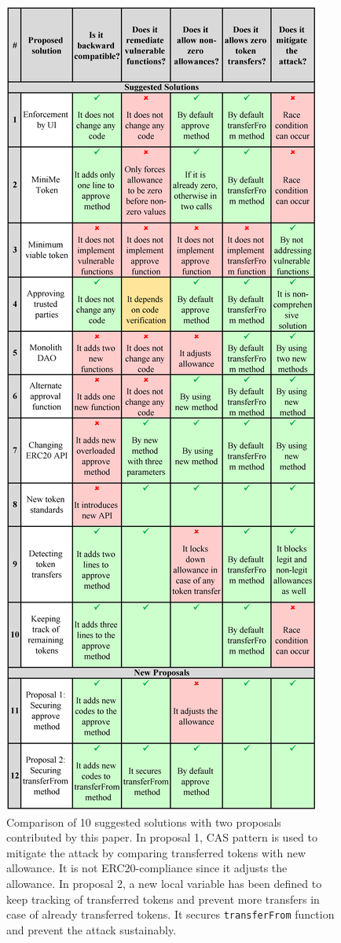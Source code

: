 \begin{figure}[t!]
	\centering
	\includegraphics[width=1.0\linewidth]{figures/multiple_withdrawal_34.png}
	\caption{Comparison of 10 suggested solutions with two proposals contributed by this paper. In proposal 1, CAS pattern is used to mitigate the attack by comparing transferred tokens with new allowance. It is not ERC20-compliance since it adjusts the allowance. In proposal 2, a new local variable has been defined to keep tracking of transferred tokens and prevent more transfers in case of already transferred tokens. It secures \texttt{transferFrom} function and prevent the attack sustainably.\label{tab:comp}}
\end{figure}
